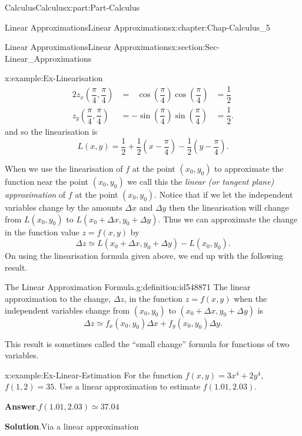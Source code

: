 \documentclass[oneside,10pt,]{book}
\newcommand{\blocktitlefont}{\relax}
\numberwithin{equation}{section}
\newcommand{\amp}{&}
\begin{document}
\begin{partptx}{Calculus}{}{Calculus}{}{}{x:part:Part-Calculus}
\begin{chapterptx}{Linear Approximations}{}{Linear Approximations}{}{}{x:chapter:Chap-Calculus_5}
\begin{sectionptx}{Linear Approximations}{}{Linear Approximations}{}{}{x:section:Sec-Linear_Approximations}
\begin{example}{}{x:example:Ex-Linearisation}
\begin{alignat*}{2}
z_x \left(\dfrac{\pi}{4},\dfrac{\pi}{4} \right) \amp = \, \, \, \, \cos \left(\dfrac{\pi}{4} \right) \cos \left(\dfrac{\pi}{4} \right) \amp = \dfrac{1}{2}\\
z_y \left(\dfrac{\pi}{4},\dfrac{\pi}{4} \right) \amp = -\sin \left(\dfrac{\pi}{4} \right) \sin \left(\dfrac{\pi}{4} \right) \amp = \dfrac{1}{2}\text{.}
\end{alignat*}
and so the linearisation is%
\begin{equation*}
L(x,y) = \dfrac{1}{2} + \dfrac{1}{2} \left( x - \dfrac{\pi}{4} \right) - \dfrac{1}{2} \left(y - \dfrac{\pi}{4} \right)\text{.}
\end{equation*}
%
\end{example}
When we use the linearisation of \(f\) at the point \((x_0,y_0)\) to approximate the function near the point \((x_0,y_0)\) we call this the \emph{linear (or tangent plane) approximation} of \(f\) at the point \((x_0,y_0)\). Notice that if we let the independent variables change by the amounts \(\Delta x\) and \(\Delta y\) then the linearisation will change from \(L(x_0,y_0)\) to \(L(x_0+\Delta x, y_0 + \Delta y)\). Thus we can approximate the change in the function value \(z=f(x,y)\) by%
\begin{equation*}
\Delta z \simeq L(x_0 + \Delta x, y_0 + \Delta y) - L(x_0,y_0).
\end{equation*}
On using the linearisation formula given above, we end up with the following result.%
\begin{definition}{The Linear Approximation Formula.}{g:definition:id548871}%
The  linear  approximation  to  the  change, \(\Delta z\),  in  the  function \(z = f(x,y)\) when  the independent variables change from \((x_0,y_0)\) to \((x_0+\Delta x, y_0 + \Delta y)\) is%
\begin{equation*}
\Delta z \simeq f_x (x_0, y_0) \Delta x + f_y (x_0, y_0) \Delta y\text{.}
\end{equation*}
%
\end{definition}
This result is sometimes called the ``small change'' formula for functions of two variables.%
\begin{example}{}{x:example:Ex-Linear-Estimation}%
For the function \(f(x,y) = 3x^4+2y^4\), \(f(1,2) = 35\). Use a linear approximation to estimate \(f(1.01,2.03)\).%
\par\smallskip%
\noindent\textbf{\blocktitlefont Answer}.\hypertarget{g:answer:id548937}{}\quad{}\(f(1.01,2.03) \simeq 37.04\)%
\par\smallskip%
\noindent\textbf{\blocktitlefont Solution}.\hypertarget{g:solution:id548935}{}\quad{}Via a linear approximation%

\end{example}
\end{sectionptx}
\end{chapterptx}
\end{partptx}
\end{document}
